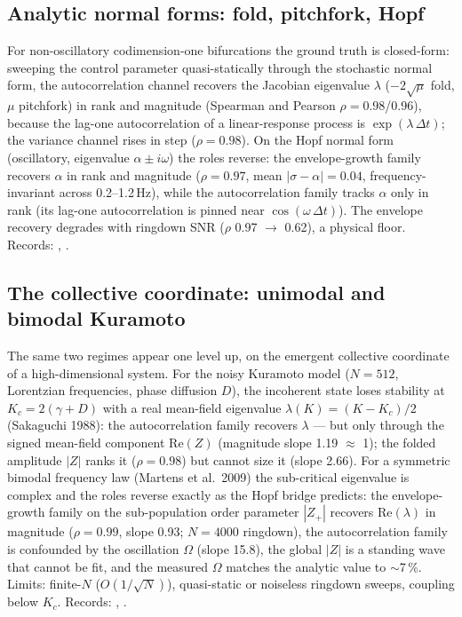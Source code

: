 \documentclass[journal]{IEEEtran}
\begin{document}
\subsection{Analytic normal forms: fold, pitchfork, Hopf}\label{sec:normalforms}

For non-oscillatory codimension-one bifurcations the ground truth is
closed-form: sweeping the control parameter quasi-statically through
the stochastic normal form, the autocorrelation channel recovers the
Jacobian eigenvalue $\lambda$ ($-2\sqrt{\mu}$ fold, $\mu$ pitchfork)
in rank and magnitude (Spearman and Pearson $\rho = 0.98$/0.96),
because the lag-one autocorrelation of a linear-response process is
$\exp(\lambda\,\Delta t)$; the variance channel rises in step
($\rho = 0.98$). On the Hopf normal form (oscillatory, eigenvalue
$\alpha \pm i\omega$) the roles reverse: the envelope-growth family
recovers $\alpha$ in rank and magnitude ($\rho = 0.97$, mean
$|\sigma - \alpha| = 0.04$, frequency-invariant across 0.2--1.2\,Hz),
while the autocorrelation family tracks $\alpha$ only in rank (its
lag-one autocorrelation is pinned near $\cos(\omega\,\Delta t)$). The
envelope recovery degrades with ringdown SNR ($\rho$ 0.97 $\to$ 0.62),
a physical floor. Records:
,
.

\subsection{The collective coordinate: unimodal and bimodal Kuramoto}\label{sec:kuramoto}

The same two regimes appear one level up, on the emergent collective
coordinate of a high-dimensional system. For the noisy Kuramoto model
($N = 512$, Lorentzian frequencies, phase diffusion $D$), the
incoherent state loses stability at $K_c = 2(\gamma + D)$ with a real
mean-field eigenvalue $\lambda(K) = (K - K_c)/2$ (Sakaguchi 1988): the
autocorrelation family recovers $\lambda$ --- but only through the
signed mean-field component $\mathrm{Re}(Z)$ (magnitude slope 1.19
$\approx$ 1); the folded amplitude $|Z|$ ranks it ($\rho = 0.98$) but
cannot size it (slope 2.66). For a symmetric bimodal frequency law
(Martens et al.\ 2009) the sub-critical eigenvalue is complex and the
roles reverse exactly as the Hopf bridge predicts: the envelope-growth
family on the sub-population order parameter $|Z_+|$ recovers
$\mathrm{Re}(\lambda)$ in magnitude ($\rho = 0.99$, slope 0.93;
$N = 4000$ ringdown), the autocorrelation family is confounded by the
oscillation $\Omega$ (slope 15.8), the global $|Z|$ is a standing wave
that cannot be fit, and the measured $\Omega$ matches the analytic
value to $\sim$7\,\%. Limits: finite-$N$ ($O(1/\sqrt{N})$),
quasi-static or noiseless ringdown sweeps, coupling below $K_c$.
Records:
,
.
\end{document}
